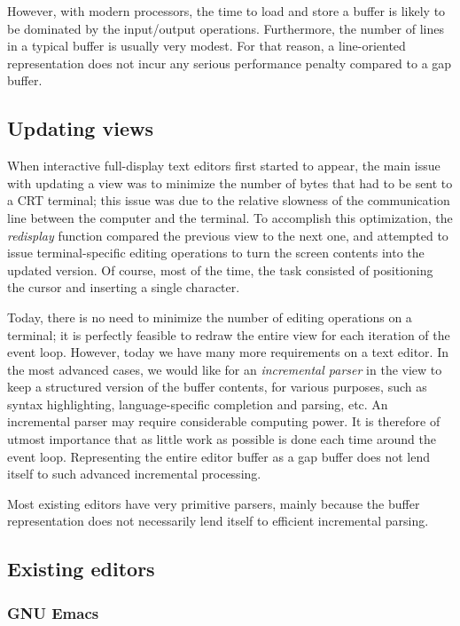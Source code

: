However, with modern processors, the time to load and store a buffer
is likely to be dominated by the input/output operations.
Furthermore, the number of lines in a typical buffer is usually very
modest.  For that reason, a line-oriented representation does not
incur any serious performance penalty compared to a gap buffer.

\subsection{Updating views}

When interactive full-display text editors first started to appear,
the main issue with updating a view was to minimize the number of
bytes that had to be sent to a CRT terminal; this issue was due to the
relative slowness of the communication line between the computer and
the terminal.  To accomplish this optimization, the \emph{redisplay}
function compared the previous view to the next one, and attempted to
issue terminal-specific editing operations to turn the screen contents
into the updated version.  Of course, most of the time, the task
consisted of positioning the cursor and inserting a single character.

Today, there is no need to minimize the number of editing operations
on a terminal; it is perfectly feasible to redraw the entire view for
each iteration of the event loop.  However, today we have many more
requirements on a text editor.  In the most advanced cases, we would
like for an \emph{incremental parser} in the view to keep a structured
version of the buffer contents, for various purposes, such as syntax
highlighting, language-specific completion and parsing, etc.  An
incremental parser may require considerable computing power.  It is
therefore of utmost importance that as little work as possible is done
each time around the event loop.  Representing the entire editor
buffer as a gap buffer does not lend itself to such advanced
incremental processing.

Most existing editors have very primitive parsers, mainly because the
buffer representation does not necessarily lend itself to efficient
incremental parsing.

\subsection{Existing editors}

\subsubsection{GNU Emacs}

